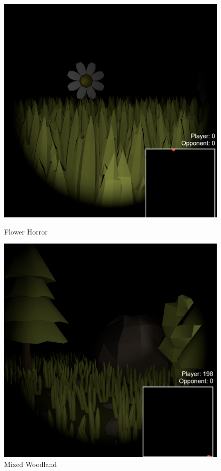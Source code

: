 \documentclass[11pt]{article}
\begin{document}
\begin{figure}[h!]
    \centering
    \begin{minipage}{0.3\textwidth}
        \centering
        \includegraphics[width=\linewidth]{flowerfield}
        \caption{Flower Horror}
    \end{minipage}%
    \hspace{0.5cm}
    \begin{minipage}{0.3\textwidth}
        \centering
        \includegraphics[width=\linewidth]{woodlands}
        \caption{Mixed Woodland}
    \end{minipage}


\end{figure}
\end{document}
